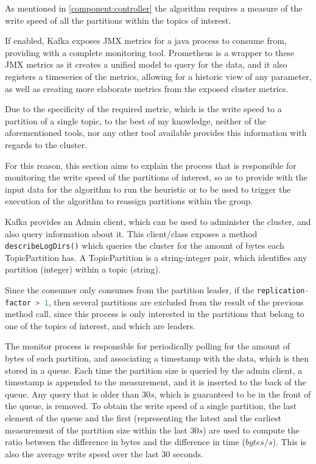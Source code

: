 As mentioned in \ref{component:controller} the algorithm requires a measure of
the write speed of all the partitions within the topics of interest.

If enabled, Kafka exposes JMX metrics for a java process to consume from,
providing with a complete monitoring tool. Prometheus is a wrapper to these JMX
metrics as it creates a unified model to query for the data, and it also
registers a timeseries of the metrics, allowing for a historic view of any
parameter, as well as creating more elaborate metrics from the exposed cluster
metrics.

Due to the specificity of the required metric, which is the write speed to a
partition of a single topic, to the best of my knowledge, neither of the
aforementioned tools, nor any other tool available provides this information
with regards to the cluster.

For this reason, this section aims to explain the process that is responsible
for monitoring the write speed of the partitions of interest, so as to provide
with the input data for the algorithm to run the heuristic or to be used to
trigger the execution of the algorithm to reassign partitions within the group.

Kafka provides an Admin client, which can be used to administer the cluster, and
also query information about it. This client/class exposes a method
\lstinline[language=Python]{describeLogDirs()} which queries the cluster for the
amount of bytes each TopicPartition has. A TopicPartition is a string-integer
pair, which identifies any partition (integer) within a topic (string). 

Since the consumer only consumes from the partition leader, if the
\lstinline[language=Python]{replication-factor > 1}, then several partitions are
excluded from the result of the previous method call, since this process is only
interested in the partitions that belong to one of the topics of interest, and
which are leaders.

The monitor process is responsible for periodically polling for the amount of
bytes of each partition, and associating a timestamp with the data, which is
then stored in a queue. Each time the partition size is queried by the admin
client, a timestamp is appended to the measurement, and it is inserted to the
back of the queue. Any query that is older than $30s$, which is guaranteed to be
in the front of the queue, is removed. To obtain the write speed of a single
partition, the last element of the queue and the first (representing the latest
and the earliest measurement of the partition size within the last $30s$) are
used to compute the ratio between the difference in bytes and the difference in
time ($bytes/s$). This is also the average write speed over the last 30 seconds.

